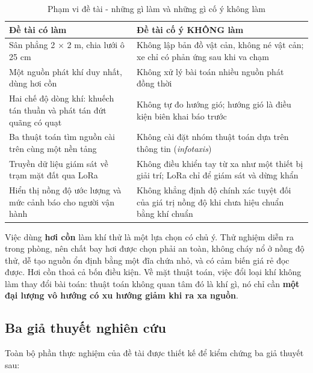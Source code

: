 \begin{table}[!htbp]
  \centering
  \caption{Phạm vi đề tài - những gì làm và những gì cố ý không làm}
  \small
  \renewcommand{\arraystretch}{1.25}
  \begin{tabular}{>{\raggedright\arraybackslash}p{}>{\raggedright\arraybackslash}p{}}
    \toprule
    \textbf{Đề tài có làm} & \textbf{Đề tài cố ý KHÔNG làm} \\
    \midrule
    Sân phẳng 2 $\times$ 2 m, chia lưới ô 25 cm & Không lập bản đồ vật cản, không né vật cản; xe chỉ có phản ứng sau khi va chạm \\
    Một nguồn phát khí duy nhất, dùng hơi cồn & Không xử lý bài toán nhiều nguồn phát đồng thời \\
    Hai chế độ dòng khí: khuếch tán thuần và phát tán đứt quãng có quạt & Không tự đo hướng gió; hướng gió là điều kiện biên khai báo trước \\
    Ba thuật toán tìm nguồn cài trên cùng một nền tảng & Không cài đặt nhóm thuật toán dựa trên thông tin (\textit{infotaxis}) \\
    Truyền dữ liệu giám sát về trạm mặt đất qua LoRa & Không điều khiển tay từ xa như một thiết bị giải trí; LoRa chỉ để giám sát và dừng khẩn \\
    Hiển thị nồng độ ước lượng và mức cảnh báo cho người vận hành & Không khẳng định độ chính xác tuyệt đối của giá trị nồng độ khi chưa hiệu chuẩn bằng khí chuẩn \\
    \bottomrule
  \end{tabular}
\end{table}
Việc dùng \textbf{hơi cồn} làm khí thử là một lựa chọn có chủ ý. Thử nghiệm diễn ra trong phòng, nên chất bay hơi được chọn phải an toàn, không cháy nổ ở nồng độ thử, dễ tạo nguồn ổn định bằng một đĩa chứa nhỏ, và có cảm biến giá rẻ đọc được. Hơi cồn thoả cả bốn điều kiện. Về mặt thuật toán, việc đổi loại khí không làm thay đổi bài toán: thuật toán không quan tâm đó là khí gì, nó chỉ cần \textbf{một đại lượng vô hướng có xu hướng giảm khi ra xa nguồn}.


\subsection{Ba giả thuyết nghiên cứu}
Toàn bộ phần thực nghiệm của đề tài được thiết kế để kiểm chứng ba giả thuyết sau:

